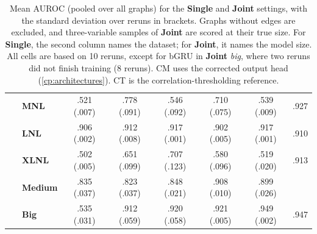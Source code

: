 \begin{table}[ht]
\begin{tabular}{l|lccccc|c}
        \rowcolor[HTML]{fff8e6}~ & \textbf{MNL} & .521 (.007) & .778 (.091) & .546 (.092) & .710 (.075) & .539 (.009) & .927 \\
        \rowcolor[HTML]{fff8e6}~ & \textbf{LNL} & .906 (.002) & .912 (.008) & .917 (.001) & .902 (.005) & .917 (.001) & .910 \\
        \rowcolor[HTML]{fff8e6}\multirow{-6}{*}{\rotatebox[origin=c]{90}{\textbf{Single}}} & \textbf{XLNL} & .502 (.005) & .651 (.099) & .707 (.123) & .580 (.096) & .519 (.020) & .913 \\
        \midrule\midrule
        \rowcolor[HTML]{fff8e6}~ & \textbf{Medium} & .835 (.037) & .823 (.037) & .848 (.021) & .908 (.010) & .899 (.026) & \\
        \rowcolor[HTML]{fff8e6}\multirow{-2}{*}{\rotatebox[origin=c]{90}{\textbf{Joint}}} & \textbf{Big} & .535 (.031) & .912 (.059) & .920 (.058) & .921 (.005) & .949 (.002) & \multirow{-2}{*}{.947} \\
    \bottomrule
    \end{tabular}
    \caption{Mean AUROC (pooled over all graphs) for the \textbf{Single} and \textbf{Joint} settings, with the standard deviation over reruns in brackets. Graphs without edges are excluded, and three-variable samples of \textbf{Joint} are scored at their true size. For \textbf{Single}, the second column names the dataset; for \textbf{Joint}, it names the model size. All cells are based on 10 reruns, except for bGRU in \textbf{Joint} \emph{big}, where two reruns did not finish training (8 reruns). CM uses the corrected output head (\cref{cp:architectures}). CT is the correlation-thresholding reference.}
\label{tab:cp:synthetic-auroc}
\end{table}
